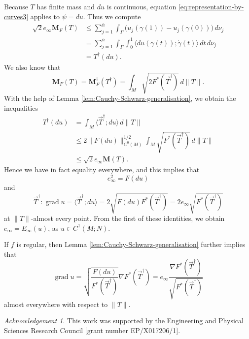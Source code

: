 \documentclass[a4paper]{article}
\newcommand{\M}{\mathbf{M}}
\newcommand{\ndim}{{\bar{n}}}
\DeclareMathOperator{\grad}{grad}
\newcommand{\pairing}[2]{\langle #1; #2 \rangle}
\theoremstyle{definition}
\theoremstyle{remark}
\newtheorem*{acknowledgement}{Acknowledgement}
\begin{document}
Because $T$ has finite mass and $du$ is continuous, equation \eqref{eq:representation-by-curves3} applies to $\psi = du$. Thus we compute
\[
\begin{split}
\sqrt{2} e_\infty \M_F(T) & \le \sum_{j = 1}^\ndim \int_\Gamma \bigl(u_j(\gamma(1)) - u_j(\gamma(0))\bigr) \, d\nu_j \\
& = \sum_{j = 1}^\ndim \int_\Gamma \int_0^1 \pairing{du(\gamma(t))}{\dot{\gamma}(t)} \, dt \, d\nu_j \\
& = T^\dagger(du).
\end{split}
\]
We also know that
\[
\M_F(T) = \M_F^\dagger(T^\dagger) = \int_M \sqrt{2F^*(\vec{T}^\dagger)} \, d\|T\|.
\]
With the help of Lemma \ref{lem:Cauchy-Schwarz-generalisation}, we obtain
the inequalities
\[
\begin{split}
T^\dagger(du) & = \int_M \pairing{\vec{T}^\dagger}{du} \, d\|T\| \\
& \le 2\|F(du)\|_{C^0(M)}^{1/2} \int_M \sqrt{F^*(\vec{T}^\dagger)} \, d\|T\| \\
& \le \sqrt{2} e_\infty \M(T).
\end{split}
\]
Hence we have in fact equality everywhere, and this implies that
\[
e_\infty^2 = F(du)
\]
and
\[
\vec{T}^\dagger : \grad u = \pairing{\vec{T}^\dagger}{du} = 2\sqrt{F(du) F^*(\vec{T}^\dagger)} = 2e_\infty \sqrt{F^*(\vec{T}^\dagger)}
\]
at $\|T\|$-almost every point. From the first of these identities,
we obtain $e_\infty = E_\infty(u)$, as $u \in C^1(M; N)$.

If $f$ is regular, then Lemma \ref{lem:Cauchy-Schwarz-generalisation} further implies that
\[
\grad u = \sqrt{\frac{F(du)}{F^*(\vec{T}^\dagger)}} \nabla F^*(\vec{T}^\dagger) = e_\infty \frac{\nabla F^*(\vec{T}^\dagger)}{\sqrt{F^*(\vec{T}^\dagger)}}
\]
almost everywhere with respect to $\|T\|$.


\begin{acknowledgement}
This work was supported by the Engineering and Physical Sciences Research Council [grant number EP/X017206/1].
\end{acknowledgement}
\end{document}
